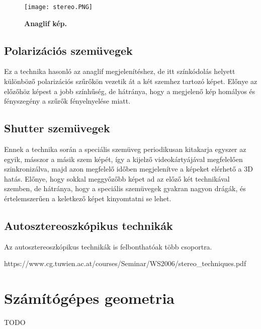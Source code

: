 \documentclass[12pt]{extarticle}
\begin{document}
\begin{figure}[H]
    \centering
    \texttt{[image: stereo.PNG]}
    \caption{\textbf{Anaglif kép.}}
    \label{fig:GeneralDiagram}
 \end{figure}



\subsection{Polarizációs szemüvegek}

Ez a technika hasonló az anaglif megjelenítéshez, de itt színkódolás helyett különböző polarizációs szűrőkön vezetik át a két szemhez tartozó képet. Előnye az előzőhöz képest a jobb színhűség, de hátránya, hogy a megjelenő kép homályos és fényszegény a szűrők fényelnyelése miatt.

\subsection{Shutter szemüvegek}

Ennek a technika során a speciális szemüveg periodikusan kitakarja egyszer az egyik, másszor a másik szem képét, így a kijelző videokártyájával megfelelően szinkronizálva, majd azon megfelelő időben megjelenítve a képeket elérhető a 3D hatás. Előnye, hogy sokkal meggyőzőbb képet ad az előző két technikával szemben, de hátránya, hogy a speciális szemüvegek gyakran nagyon drágák, és értelemszerűen a keletkező képet kinyomtatni se lehet. \newline
\subsection{Autosztereoszkópikus technikák}
Az autosztereoszkópikus technikák is felbonthatóak több csoportra. 
 
https://www.cg.tuwien.ac.at/courses/Seminar/WS2006/stereo_techniques.pdf

\section{Számítógépes geometria}
TODO


\end{document}
